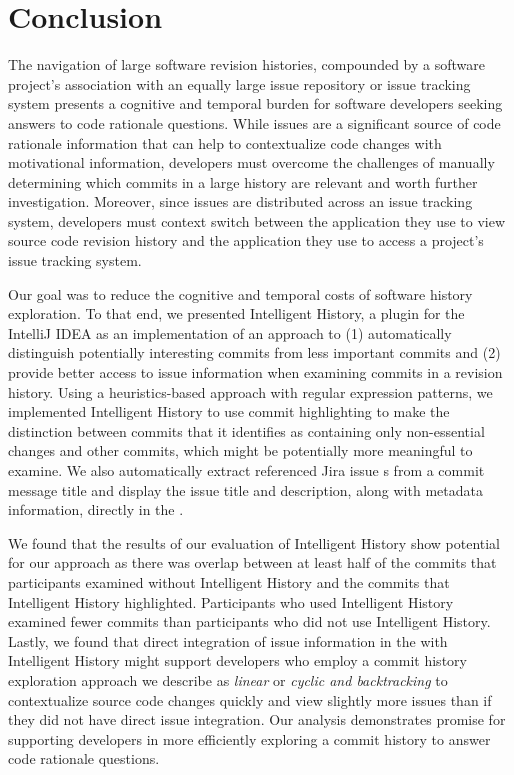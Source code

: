 \chapter{Conclusion}
\label{ch:Conclusion}

The navigation of large software revision histories, compounded by a software
project's association with an equally large issue repository or issue tracking system
presents a cognitive and temporal burden for software developers seeking 
answers to code rationale questions.
While issues are a significant source of code rationale information that
can help to contextualize code changes with motivational information,
developers must overcome the challenges of manually determining
which commits in a large history are relevant and worth further investigation.
Moreover, since issues are distributed across an issue tracking system,
developers must context switch between the application they use to view
source code revision history and the application they use to access a project's issue tracking system.

Our goal was to reduce the cognitive and temporal costs of software history exploration.
To that end, we presented Intelligent History, a plugin for the IntelliJ IDEA 
as an implementation of an approach to (1) automatically distinguish potentially interesting
commits from less important commits and (2) provide better access to issue information 
when examining commits in a revision history.
Using a heuristics-based approach with regular expression patterns, 
we implemented Intelligent History to use commit highlighting 
to make the distinction between commits that it identifies as containing
only non-essential changes and other commits, which might be potentially more meaningful to examine.
We also automatically extract referenced Jira issue s from a commit message title
and display the issue title and description, along with metadata information, directly in the .

We found that the results of our evaluation of Intelligent History show
potential for our approach as there was overlap between at least half of the commits
that participants examined without Intelligent History and the commits that Intelligent History
highlighted. Participants who used Intelligent History examined
fewer commits than participants who did not use Intelligent History.
Lastly, we found that direct integration of issue information in the 
with Intelligent History might support developers who employ a commit history exploration approach
we describe as \textit{linear} or \textit{cyclic and backtracking} to contextualize
source code changes quickly and view slightly more issues than if they did not have
direct issue integration.
Our analysis demonstrates promise for supporting developers in more
efficiently exploring a commit history to answer code rationale questions.